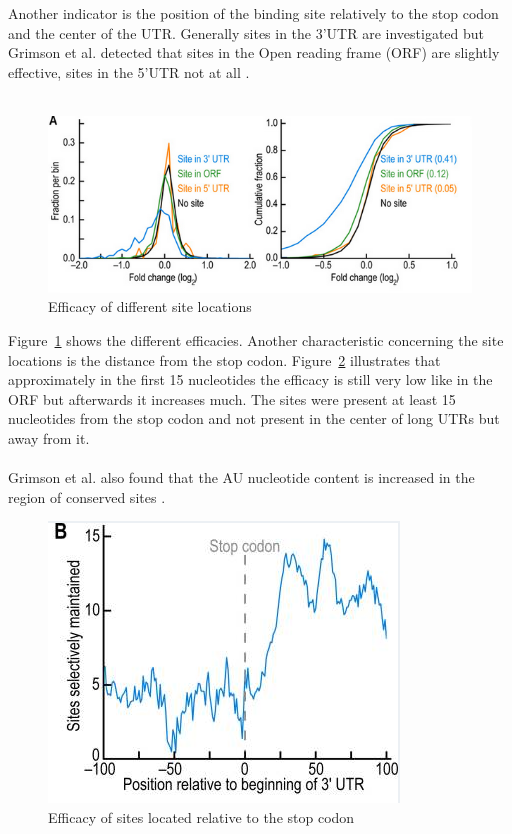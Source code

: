 \documentclass[12pt]{article}
\begin{document}
Another indicator is the position of the binding site relatively to the stop codon and the center of the UTR. Generally sites in the 3'UTR are investigated but Grimson et al. detected that sites in the Open reading frame (ORF) are slightly effective, sites in the 5'UTR not at all \cite{Grimson}. \\\\

\begin{figure}
\centering
\includegraphics[scale=0.7]{results/sites_orf.PNG}
\caption{Efficacy of different site locations}
\label{siteorf}
\end{figure}

Figure~\ref{siteorf} shows the different efficacies. Another characteristic concerning the site locations is the distance from the stop codon. Figure~\ref{sitestop} illustrates that approximately in the first 15 nucleotides the efficacy is still very low like in the ORF but afterwards it increases much. 
The sites were present at least 15 nucleotides from the stop codon and not present in the center of long UTRs but away from it. \\\\

Grimson et al. also found that the AU nucleotide content is increased in the region of conserved sites \cite{Grimson}.

\begin{figure}
\centering
\includegraphics[scale=0.6]{results/site_stop.PNG} 
\caption{Efficacy of sites located relative to the stop codon}
\label{sitestop}
\end{figure}
\end{document}
